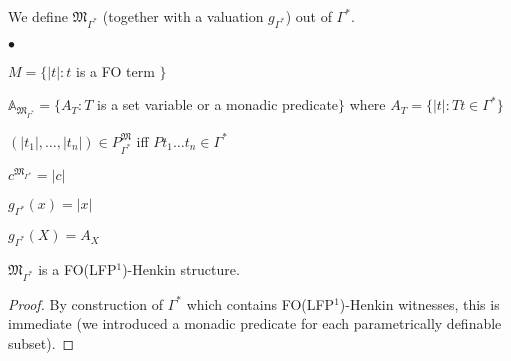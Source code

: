 \documentclass{LMCS}
\newcommand{\frM}{\mathfrak{M}}
\newcommand{\fo}{\textsf{FO}\xspace}
\newcommand{\folfp}{\textsf{FO(LFP$^1$)}\xspace}
\begin{document}
\begin{defi}
We define $\frM_{\Gamma^*}$ (together with a valuation $g_{\Gamma^*}$) out of $\Gamma^*$.
\begin{iteMize}{$\bullet$}
\item   $M=\{|t|:t$ is a \fo term $\}$
\item   $\mathbb{A}_{\frM_{\Gamma^*}}=\{A_T:T$ is a set variable or a monadic predicate$\}$ where $A_T=\{|t|:Tt\in\Gamma^*\}$
\item   $(|t_1|,\ldots,|t_n|) \in P^\frM_{\Gamma^*}$ iff $Pt_1 \ldots t_n \in \Gamma^*$
\item   $c^{\frM_{\Gamma^*}}=|c|$
\item   $g_{\Gamma^*}(x)=|x|$
\item   $g_{\Gamma^*}(X)=A_X$
\end{iteMize}
\end{defi}

\begin{prop}
 $\frM_{\Gamma^*}$ is a \folfp-Henkin structure.
\end{prop}

\begin{proof}
By construction of $\Gamma^*$ which contains \folfp-Henkin witnesses, this is immediate (we introduced a
monadic predicate for each parametrically definable subset).
\end{proof}
\end{document}
